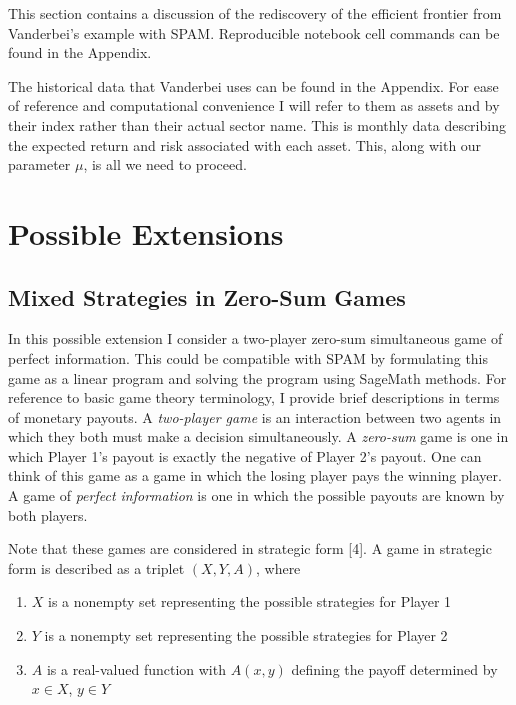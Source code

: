 \documentclass{article}
\begin{document}
This section contains a discussion of the rediscovery of the efficient frontier from Vanderbei's example with SPAM. Reproducible notebook cell commands can be found in the Appendix. 

The historical data that Vanderbei uses can be found in the Appendix. For ease of reference and computational convenience I will refer to them as assets and by their index rather than their actual sector name. This is monthly data describing the expected return and risk associated with each asset. This, along with our parameter $\mu$, is all we need to proceed. 


\section{Possible Extensions}

\subsection{Mixed Strategies in Zero-Sum Games}

In this possible extension I consider a two-player zero-sum simultaneous game of perfect information. This could be compatible with SPAM by formulating this game as a linear program and solving the program using SageMath methods. For reference to basic game theory terminology, I provide brief descriptions in terms of monetary payouts. A \textit{two-player game} is an interaction between two agents in which they both must make a decision simultaneously. A \textit{zero-sum} game is one in which Player 1's payout is exactly the negative of Player 2's payout. One can think of this game as a game in which the losing player pays the winning player. A game of \textit{perfect information} is one in which the possible payouts are known by both players. 

Note that these games are considered in strategic form [4]. A game in strategic form is described as a triplet $(X,Y,A)$, where
\begin{enumerate}
    \item $X$ is a nonempty set representing the possible strategies for Player 1
    \item $Y$ is a nonempty set representing the possible strategies for Player 2
    \item $A$ is a real-valued function with $A(x, y)$ defining the payoff determined by $x \in X$, $y \in Y$
\end{enumerate}
\end{document}
